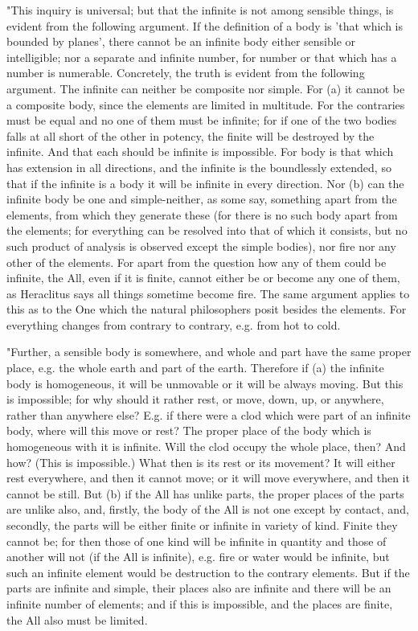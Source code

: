 "This inquiry is universal; but that the infinite is not among sensible
things, is evident from the following argument. If the definition
of a body is 'that which is bounded by planes', there cannot be an
infinite body either sensible or intelligible; nor a separate and
infinite number, for number or that which has a number is numerable.
Concretely, the truth is evident from the following argument. The
infinite can neither be composite nor simple. For (a) it cannot be
a composite body, since the elements are limited in multitude. For
the contraries must be equal and no one of them must be infinite;
for if one of the two bodies falls at all short of the other in potency,
the finite will be destroyed by the infinite. And that each should
be infinite is impossible. For body is that which has extension in
all directions, and the infinite is the boundlessly extended, so that
if the infinite is a body it will be infinite in every direction.
Nor (b) can the infinite body be one and simple-neither, as some say,
something apart from the elements, from which they generate these
(for there is no such body apart from the elements; for everything
can be resolved into that of which it consists, but no such product
of analysis is observed except the simple bodies), nor fire nor any
other of the elements. For apart from the question how any of them
could be infinite, the All, even if it is finite, cannot either be
or become any one of them, as Heraclitus says all things sometime
become fire. The same argument applies to this as to the One which
the natural philosophers posit besides the elements. For everything
changes from contrary to contrary, e.g. from hot to cold.

"Further, a sensible body is somewhere, and whole and part have the
same proper place, e.g. the whole earth and part of the earth. Therefore
if (a) the infinite body is homogeneous, it will be unmovable or it
will be always moving. But this is impossible; for why should it rather
rest, or move, down, up, or anywhere, rather than anywhere else? E.g.
if there were a clod which were part of an infinite body, where will
this move or rest? The proper place of the body which is homogeneous
with it is infinite. Will the clod occupy the whole place, then? And
how? (This is impossible.) What then is its rest or its movement?
It will either rest everywhere, and then it cannot move; or it will
move everywhere, and then it cannot be still. But (b) if the All has
unlike parts, the proper places of the parts are unlike also, and,
firstly, the body of the All is not one except by contact, and, secondly,
the parts will be either finite or infinite in variety of kind. Finite
they cannot be; for then those of one kind will be infinite in quantity
and those of another will not (if the All is infinite), e.g. fire
or water would be infinite, but such an infinite element would be
destruction to the contrary elements. But if the parts are infinite
and simple, their places also are infinite and there will be an infinite
number of elements; and if this is impossible, and the places are
finite, the All also must be limited. 

